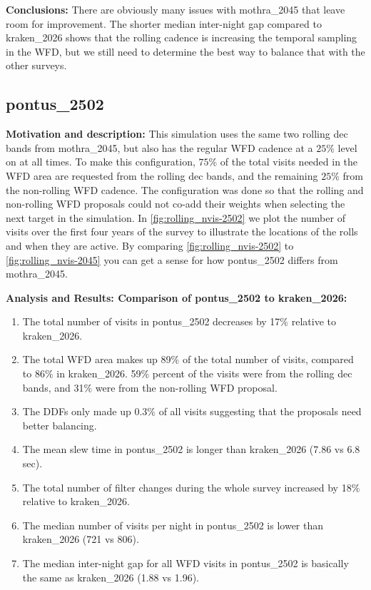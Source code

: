\documentclass[DM,authoryear,toc]{lsstdoc}
\begin{document}
\textbf{Conclusions:} There are obviously many issues with mothra\_2045 that leave room for improvement. The shorter median inter-night
gap compared to kraken\_2026 shows that the rolling cadence is increasing the temporal sampling in the WFD, but we still need to determine
the best way to balance that with the other surveys.

\subsection{pontus\_2502} \label{pontus2502}

\textbf{Motivation and description:} This simulation uses the same two rolling dec bands from mothra\_2045, but also has the
regular WFD cadence at a $25\%$ level on at all times. To make this configuration, $75\%$ of the total visits needed in the WFD area are requested from the
rolling dec bands, and the remaining $25\%$ from the non-rolling WFD cadence. The configuration was done so that the rolling and non-rolling WFD
proposals could not co-add their weights when selecting the next target in the simulation. In \autoref{fig:rolling_nvis-2502} we plot the number
of visits over the first four years of the survey to illustrate the locations of the rolls and when they are active. By comparing \autoref{fig:rolling_nvis-2502}
to \autoref{fig:rolling_nvis-2045} you can get a sense for how pontus\_2502 differs from mothra\_2045.

\textbf{Analysis and Results: Comparison of pontus\_2502 to kraken\_2026:}


\begin{enumerate}
\item The total number of visits in pontus\_2502 decreases by 17$\%$ relative to kraken\_2026.
\item The total WFD area makes up 89$\%$ of the total number of visits, compared to 86$\%$ in kraken\_2026.
59$\%$ percent of the visits were from the rolling dec bands, and 31$\%$ were from the non-rolling WFD proposal.
\item The DDFs only made up  0.3$\%$ of all visits suggesting that the proposals need better balancing.
\item The mean slew time in pontus\_2502 is longer than kraken\_2026 (7.86 vs 6.8 sec).
\item The total number of filter changes during the whole survey increased by 18$\%$ relative to kraken\_2026.
\item The median number of visits per night in pontus\_2502 is lower than kraken\_2026 (721 vs 806).
\item The median inter-night gap for all WFD visits in pontus\_2502 is basically the same as kraken\_2026  (1.88 vs 1.96).
\end{enumerate}
\end{document}
